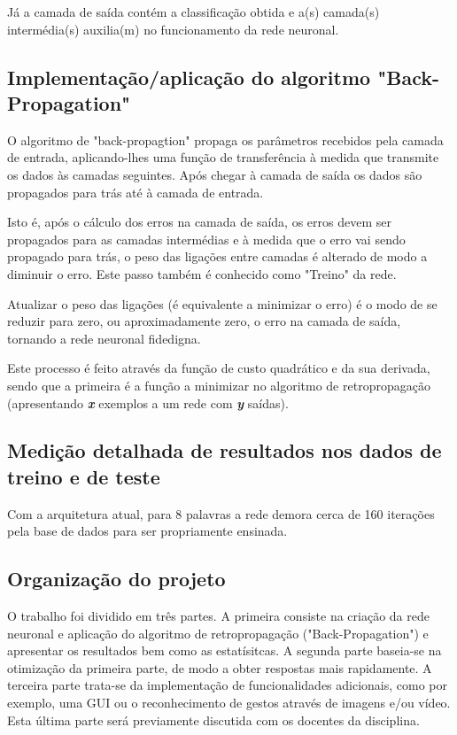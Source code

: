 \documentclass[10pt,a4paper]{article}
\begin{document}
Já a camada de saída contém a classificação obtida e a(s) camada(s) intermédia(s) auxilia(m) no funcionamento da rede neuronal.

\subsection{Implementação/aplicação do algoritmo "Back-Propagation"}
\subitem

O algoritmo de "back-propagtion" propaga os parâmetros recebidos pela camada de entrada, aplicando-lhes uma função de transferência à medida que transmite os dados às camadas seguintes. Após chegar à camada de saída os dados são propagados para trás até à camada de entrada.

Isto é, após o cálculo dos erros na camada de saída, os erros devem ser propagados para as camadas intermédias e à medida que o erro vai sendo propagado para trás, o peso das ligações entre camadas é alterado de modo a diminuir o erro. Este passo também é conhecido como "Treino" da rede.

Atualizar o peso das ligações (é equivalente a minimizar o erro) é o modo de se reduzir para zero, ou aproximadamente zero, o erro na camada de saída, tornando a rede neuronal fidedigna.

Este processo é feito através da função de custo quadrático e da sua derivada, sendo que a primeira é a função a minimizar no algoritmo de retropropagação (apresentando \textbf{\textit{x}} exemplos a um rede com \textbf{\textit{y}} saídas).


\subsection{Medição detalhada de resultados nos dados de treino e de teste}
\subitem

Com a arquitetura atual, para 8 palavras a rede demora cerca de 160 iterações pela base de dados para ser propriamente ensinada.

\subsection{Organização do projeto}
\subitem

O trabalho foi dividido em três partes. 
A primeira consiste na criação da rede neuronal e aplicação do algoritmo de retropropagação ("Back-Propagation") e apresentar os resultados bem como as estatísitcas.
A segunda parte baseia-se na otimização da primeira parte, de modo a obter respostas mais rapidamente.
A terceira parte trata-se da implementação de funcionalidades adicionais, como por exemplo, uma GUI ou o reconhecimento de gestos através de imagens e/ou vídeo. Esta última parte será previamente discutida com os docentes da disciplina.
\end{document}
